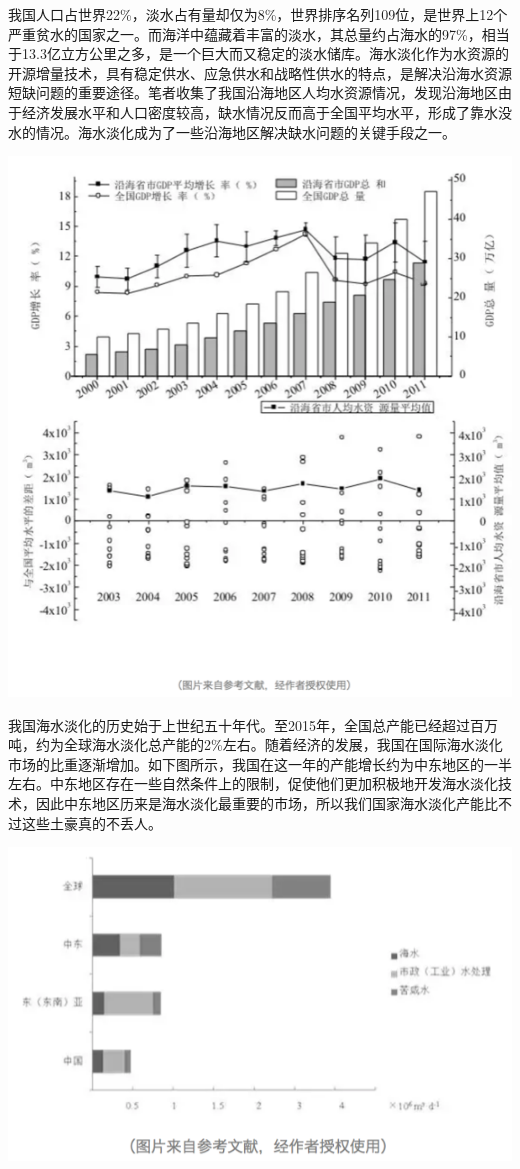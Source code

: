 \documentclass[
]{book}
\begin{document}
我国人口占世界22\%，淡水占有量却仅为8\%，世界排序名列109位，是世界上12个严重贫水的国家之一。而海洋中蕴藏着丰富的淡水，其总量约占海水的97\%，相当于13.3亿立方公里之多，是一个巨大而又稳定的淡水储库。海水淡化作为水资源的开源增量技术，具有稳定供水、应急供水和战略性供水的特点，是解决沿海水资源短缺问题的重要途径。笔者收集了我国沿海地区人均水资源情况，发现沿海地区由于经济发展水平和人口密度较高，缺水情况反而高于全国平均水平，形成了靠水没水的情况。海水淡化成为了一些沿海地区解决缺水问题的关键手段之一。

\includegraphics[width=7.76in]{images/seawater3}

我国海水淡化的历史始于上世纪五十年代。至2015年，全国总产能已经超过百万吨，约为全球海水淡化总产能的2\%左右。随着经济的发展，我国在国际海水淡化市场的比重逐渐增加。如下图所示，我国在这一年的产能增长约为中东地区的一半左右。中东地区存在一些自然条件上的限制，促使他们更加积极地开发海水淡化技术，因此中东地区历来是海水淡化最重要的市场，所以我们国家海水淡化产能比不过这些土豪真的不丢人。

\includegraphics[width=8.33in]{images/seawater4}
\end{document}
